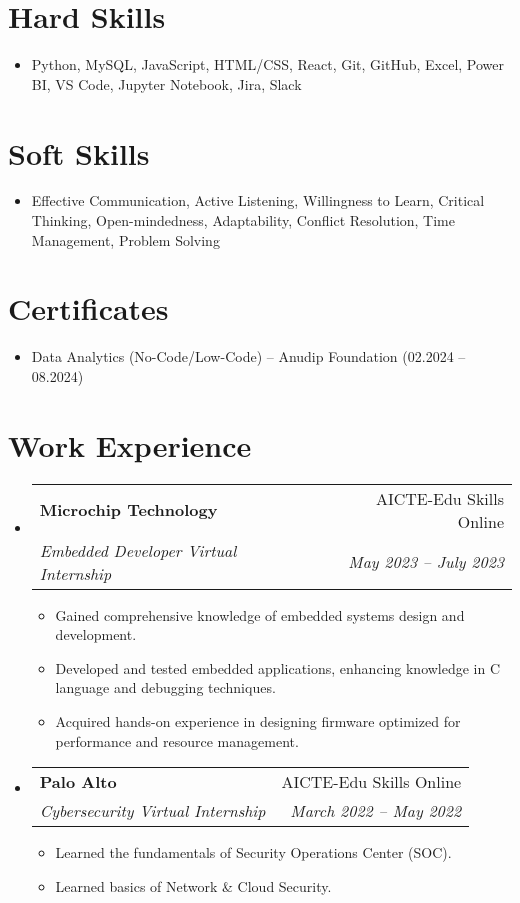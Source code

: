 \documentclass[letterpaper,11pt]{article}
\makeatletter
\newcommand{\resumeItem}[2]{
  \item\small{
    \textbf{#1}{ #2 \vspace{-2pt}}
  }
}
\newcommand{\resumeSubheading}[4]{
  \vspace{-1pt}\item
    \begin{tabular*}{0.97\textwidth}{l@{\extracolsep{\fill}}r}
      \textbf{#1} & #2 \\
      \textit{\small#3} & \textit{\small #4} \\
    \end{tabular*}\vspace{-5pt}
}
\newcommand{\resumeSubItem}[2]{\resumeItem{#1}{#2}\vspace{-4pt}}
\newcommand{\resumeSubHeadingListStart}{\begin{itemize}[leftmargin=*]}
\newcommand{\resumeSubHeadingListEnd}{\end{itemize}}
\newcommand{\resumeItemListStart}{\begin{itemize}}
\newcommand{\resumeItemListEnd}{\end{itemize}\vspace{-5pt}}
\makeatother
\begin{document}
\section{Hard Skills}
\resumeSubHeadingListStart
  \resumeSubItem{}{Python, MySQL, JavaScript, HTML/CSS, React, Git, GitHub, Excel, Power BI, VS Code, Jupyter Notebook, Jira, Slack}
\resumeSubHeadingListEnd

\section{Soft Skills}
\resumeSubHeadingListStart
  \resumeSubItem{}{Effective Communication, Active Listening, Willingness to Learn, Critical Thinking, Open-mindedness, Adaptability, Conflict Resolution, Time Management, Problem Solving}
\resumeSubHeadingListEnd

\section{Certificates}
\resumeSubHeadingListStart
  \resumeSubItem{}{Data Analytics (No-Code/Low-Code) -- Anudip Foundation (02.2024 – 08.2024)}
\resumeSubHeadingListEnd

\section{Work Experience}
\resumeSubHeadingListStart
  \resumeSubheading
    {Microchip Technology}{AICTE-Edu Skills Online}
    {Embedded Developer Virtual Internship}{May 2023 -- July 2023}
    \resumeItemListStart
      \resumeItem{}{Gained comprehensive knowledge of embedded systems design and development.}
      \resumeItem{}{Developed and tested embedded applications, enhancing knowledge in C language and debugging techniques.}
      \resumeItem{}{Acquired hands-on experience in designing firmware optimized for performance and resource management.}
    \resumeItemListEnd

  \resumeSubheading
    {Palo Alto}{AICTE-Edu Skills Online}
    {Cybersecurity Virtual Internship}{March 2022 -- May 2022}
    \resumeItemListStart
      \resumeItem{}{Learned the fundamentals of Security Operations Center (SOC).}
      \resumeItem{}{Learned basics of Network \& Cloud Security.}
    \resumeItemListEnd
\resumeSubHeadingListEnd

\end{document}
